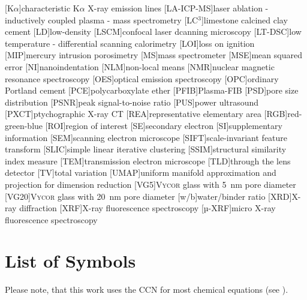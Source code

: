 \begin{acronym}[LA-ICP-MS]
	[K$\alpha$]{characteristic K$\alpha$ X-ray emission lines}
	[LA-ICP-MS]{laser ablation - inductively coupled plasma - mass spectrometry}
	[LC$^3$]{limestone calcined clay cement} %
	[LD]{low-density}
	[LSCM]{confocal laser dcanning microscopy}
	[LT-DSC]{low temperature - differential scanning calorimetry}
	[LOI]{loss on ignition}
	[MIP]{mercury intrusion porosimetry}
	[MS]{mass spectrometer}
	[MSE]{mean squared error}
	[NI]{nanoindentation}
	[NLM]{non-local means}
	[NMR]{nuclear magnetic resonance spectroscopy}
	[OES]{optical emission spectroscopy}
	[OPC]{ordinary Portland cement}
	[PCE]{polycarboxylate ether}
	[PFIB]{Plasma-FIB}
	[PSD]{pore size distribution}
	[PSNR]{peak signal-to-noise ratio}
	[PUS]{power ultrasound}
	[PXCT]{ptychographic X-ray CT}
	[REA]{representative elementary area}
	[RGB]{red-green-blue}
	[ROI]{region of interest}
	[SE]{secondary electron}
	[SI]{supplementary information}
	[SEM]{scanning electron microscope}
	[SIFT]{scale-invariant feature transform}
	[SLIC]{simple linear iterative clustering}
	[SSIM]{structural similarity index measure}
	[TEM]{transmission electron microscope}
	[TLD]{through the lens detector}
	[TV]{total variation}
	[UMAP]{uniform manifold approximation and projection for dimension reduction}
	[VG5]{V\textsc{ycor} glass with \qty{5}{\nano\meter} pore diameter}
	[VG20]{V\textsc{ycor} glass with \qty{20}{\nano\meter} pore diameter}
	[w/b]{water/binder ratio} %
	[XRD]{X-ray diffraction}
	[XRF]{X-ray fluorescence spectroscopy}
	[µ-XRF]{micro X-ray fluorescence spectroscopy}
\end{acronym}

\chapter*{List of Symbols}

Please note, that this work uses the \ac{CCN} for most chemical equations (see ).

